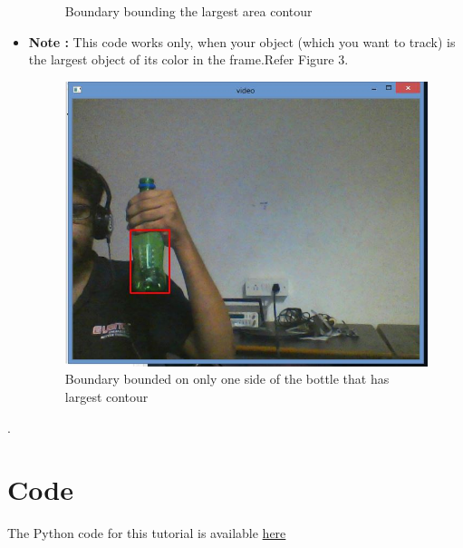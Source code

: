 \documentclass[11pt,a4paper]{article}
\begin{document}
\begin{itemize}
\begin{figure}[h]
		\centering
		\caption{Boundary bounding the largest area contour}
		\end{figure}
	\item \textbf{Note :} This code works only, when your object (which you want to track) is the largest object of its color in the frame.Refer Figure 3.
		\begin{figure}[h!]
		\includegraphics[scale=0.4]{Capture3.jpg}	
		\centering
		\caption{Boundary bounded on only one side of the bottle that has largest contour}
		\end{figure}
	\end{itemize}
	\newpage
	.
	\newpage
	\section{Code}
    The Python code for this tutorial is available \href{https://github.com/eYSIP-2016/Object-Tracking-Camera/tree/master/Tutorials/1.%20Colored%20object%20tracking%20using%20HSV/Code}{here}
\end{document}
